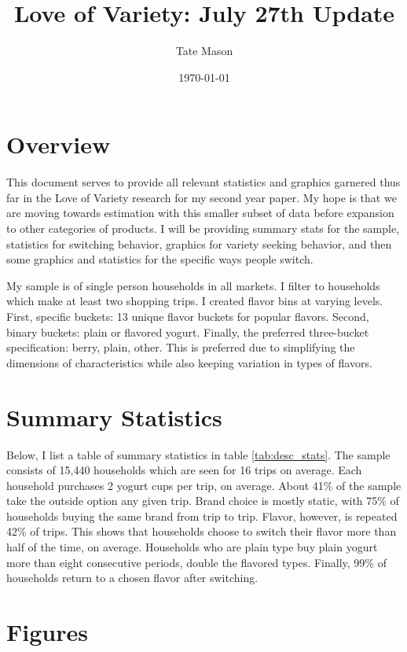 \documentclass[11pt]{article}
\title{Love of Variety: July 27th Update}
\author{Tate Mason}
\date{\today}
\theoremstyle{definition}
\theoremstyle{remark}
\begin{document}
\maketitle
\thispagestyle{empty}

\section{Overview}

This document serves to provide all relevant statistics and graphics garnered thus far in the Love of Variety research for my second year paper. My hope is that we are moving towards estimation with this smaller subset of data before expansion to other categories of products. I will be providing summary stats for the sample, statistics for switching behavior, graphics for variety seeking behavior, and then some graphics and statistics for the specific ways people switch.

My sample is of single person households in all markets. I filter to households which make at least two shopping trips. I created flavor bins at varying levels. First, specific buckets: 13 unique flavor buckets for popular flavors. Second, binary buckets: plain or flavored yogurt. Finally, the preferred three-bucket specification: berry, plain, other. This is preferred due to simplifying the dimensions of characteristics while also keeping variation in types of flavors. 

\section{Summary Statistics}

Below, I list a table of summary statistics in table \ref{tab:desc_stats}. The sample consists of 15,440 households which are seen for 16 trips on average. Each household purchases 2 yogurt cups per trip, on average. About 41\% of the sample take the outside option any given trip. Brand choice is mostly static, with 75\% of households buying the same brand from trip to trip. Flavor, however, is repeated 42\% of trips. This shows that households choose to switch their flavor more than half of the time, on average. Households who are plain type buy plain yogurt more than eight consecutive periods, double the flavored types. Finally, 99\% of households return to a chosen flavor after switching.

\section{Figures}
\end{document}
